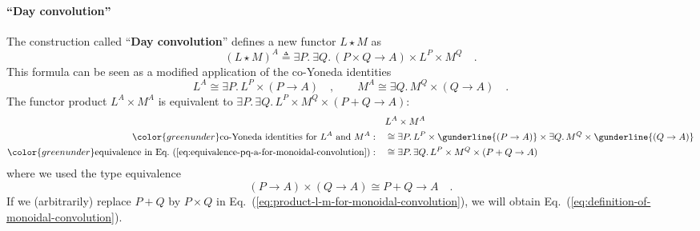 \paragraph{\textsf{``}Day convolution\textsf{''}}

The construction called \textsf{``}\textbf{Day convolution}\textsf{''}
defines a new functor $L\star M$ as 
\begin{equation}
\left(L\star M\right)^{A}\triangleq\exists P.\:\exists Q.\,\left(P\times Q\rightarrow A\right)\times L^{P}\times M^{Q}\quad.\label{eq:definition-of-monoidal-convolution}
\end{equation}
This formula can be seen as a modified application of the co-Yoneda
identities
\[
L^{A}\cong\exists P.\,L^{P}\times\left(P\rightarrow A\right)\quad,\quad\quad M^{A}\cong\exists Q.\,M^{Q}\times\left(Q\rightarrow A\right)\quad.
\]
The functor product $L^{A}\times M^{A}$ is equivalent to $\exists P.\,\exists Q.\,L^{P}\times M^{Q}\times\left(P+Q\rightarrow A\right)$:
\begin{align}
 & L^{A}\times M^{A}\nonumber \\
{\color{greenunder}\text{co-Yoneda identities for }L^{A}\text{ and }M^{A}:}\quad & \cong\exists P.\,L^{P}\times\gunderline{\left(P\rightarrow A\right)}\times\exists Q.\,M^{Q}\times\gunderline{\left(Q\rightarrow A\right)}\nonumber \\
{\color{greenunder}\text{equivalence in Eq.~(\ref{eq:equivalence-pq-a-for-monoidal-convolution})}:}\quad & \cong\exists P.\,\exists Q.\,L^{P}\times M^{Q}\times\left(P+Q\rightarrow A\right)\label{eq:product-l-m-for-monoidal-convolution}
\end{align}
where we used the type equivalence 
\begin{equation}
\left(P\rightarrow A\right)\times\left(Q\rightarrow A\right)\cong P+Q\rightarrow A\quad.\label{eq:equivalence-pq-a-for-monoidal-convolution}
\end{equation}
If we (arbitrarily) replace $P+Q$ by $P\times Q$ in Eq.~(\ref{eq:product-l-m-for-monoidal-convolution}),
we will obtain Eq.~(\ref{eq:definition-of-monoidal-convolution}).

